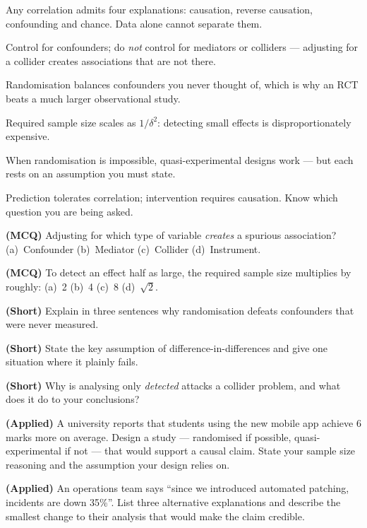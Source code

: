 \begin{chaptersummary}
\begin{tight}
  \item Any correlation admits four explanations: causation, reverse causation,
        confounding and chance. Data alone cannot separate them.
  \item Control for confounders; do \emph{not} control for mediators or colliders
        --- adjusting for a collider creates associations that are not there.
  \item Randomisation balances confounders you never thought of, which is why an
        RCT beats a much larger observational study.
  \item Required sample size scales as $1/\delta^2$: detecting small effects is
        disproportionately expensive.
  \item When randomisation is impossible, quasi-experimental designs work --- but
        each rests on an assumption you must state.
  \item Prediction tolerates correlation; intervention requires causation. Know
        which question you are being asked.
\end{tight}
\end{chaptersummary}

\begin{reviewq}
  \item \textbf{(MCQ)} Adjusting for which type of variable \emph{creates} a
        spurious association? (a)~Confounder (b)~Mediator (c)~Collider
        (d)~Instrument.
  \item \textbf{(MCQ)} To detect an effect half as large, the required sample size
        multiplies by roughly: (a)~2 (b)~4 (c)~8 (d)~$\sqrt{2}$.
  \item \textbf{(Short)} Explain in three sentences why randomisation defeats
        confounders that were never measured.
  \item \textbf{(Short)} State the key assumption of difference-in-differences and
        give one situation where it plainly fails.
  \item \textbf{(Short)} Why is analysing only \emph{detected} attacks a collider
        problem, and what does it do to your conclusions?
  \item \textbf{(Applied)} A university reports that students using the new mobile
        app achieve 6 marks more on average. Design a study --- randomised if
        possible, quasi-experimental if not --- that would support a causal claim.
        State your sample size reasoning and the assumption your design relies on.
  \item \textbf{(Applied)} An operations team says ``since we introduced automated
        patching, incidents are down 35\%''. List three alternative explanations and
        describe the smallest change to their analysis that would make the claim
        credible.
\end{reviewq}
